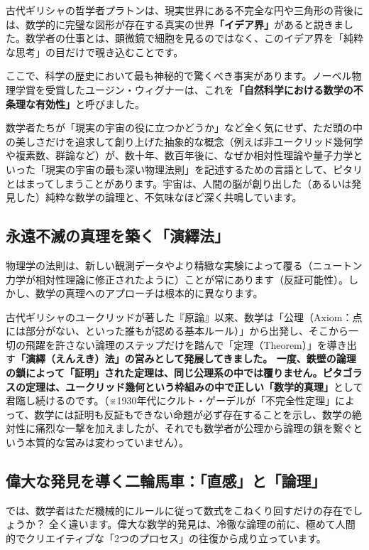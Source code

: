 古代ギリシャの哲学者プラトンは、現実世界にある不完全な円や三角形の背後には、数学的に完璧な図形が存在する真実の世界\textbf{「イデア界」}があると説きました。数学者の仕事とは、顕微鏡で細胞を見るのではなく、このイデア界を「純粋な思考」の目だけで覗き込むことです。

ここで、科学の歴史において最も神秘的で驚くべき事実があります。ノーベル物理学賞を受賞したユージン・ウィグナーは、これを\textbf{「自然科学における数学の不条理な有効性」}と呼びました。

数学者たちが「現実の宇宙の役に立つかどうか」など全く気にせず、ただ頭の中の美しさだけを追求して創り上げた抽象的な概念（例えば非ユークリッド幾何学や複素数、群論など）が、数十年、数百年後に、なぜか相対性理論や量子力学といった「現実の宇宙の最も深い物理法則」を記述するための言語として、ピタリとはまってしまうことがあります。宇宙は、人間の脳が創り出した（あるいは発見した）純粋な数学の論理と、不気味なほど深く共鳴しています。

\subsection{永遠不滅の真理を築く「演繹法」}

物理学の法則は、新しい観測データやより精緻な実験によって覆る（ニュートン力学が相対性理論に修正されたように）ことが常にあります（反証可能性）。しかし、数学の真理へのアプローチは根本的に異なります。

古代ギリシャのユークリッドが著した『原論』以来、数学は「公理（Axiom：点には部分がない、といった誰もが認める基本ルール）」から出発し、そこから一切の飛躍を許さない論理のステップだけを踏んで「定理（Theorem）」を導き出す\textbf{「演繹（えんえき）法」の営みとして発展してきました。 一度、鉄壁の論理の鎖によって「証明」された定理は、同じ公理系の中では覆りません。ピタゴラスの定理は、ユークリッド幾何という枠組みの中で正しい「数学的真理」}として君臨し続けるのです。（※1930年代にクルト・ゲーデルが「不完全性定理」によって、数学には証明も反証もできない命題が必ず存在することを示し、数学の絶対性に痛烈な一撃を加えましたが、それでも数学者が公理から論理の鎖を繋ぐという本質的な営みは変わっていません）。

\subsection{偉大な発見を導く二輪馬車：「直感」と「論理」}

では、数学者はただ機械的にルールに従って数式をこねくり回すだけの存在でしょうか？ 全く違います。偉大な数学的発見は、冷徹な論理の前に、極めて人間的でクリエイティブな「2つのプロセス」の往復から成り立っています。

